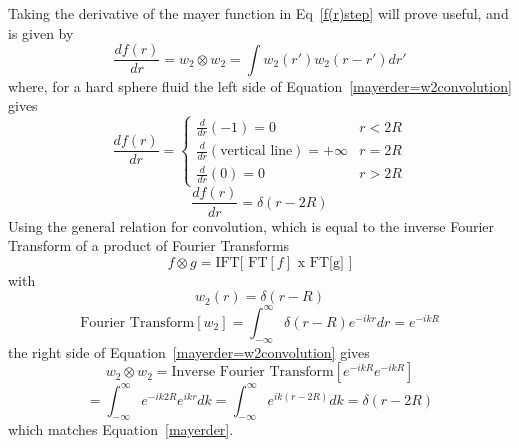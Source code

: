 \documentclass[double,12pt]{beavtex}
\begin{document}
Taking the derivative of the mayer function in Eq~\ref{f(r)step} will 
prove useful, and is given by
\begin{equation}\label{mayerder=w2convolution}{\frac{df(r)}{dr} = w_2 \otimes w_2 = \int{w_2(r')w_2(r-r')dr'}}\end{equation} 
where, for a hard sphere fluid the left side of Equation~\ref{mayerder=w2convolution} gives
\begin{displaymath}{\frac{df(r)}{dr}=\left\{ \begin{array}{rc} \frac{d}{dr}(-1)=0 & r<2R \\\frac{d}{dr}(\text{vertical line})=+\infty & r=2R \\ \frac{d}{dr}(0)=0  & r>2R \end{array}\right.}\end{displaymath}
\begin{equation}\label{mayerder}{\frac{df(r)}{dr} = \delta(r-2R)}\end{equation} 
Using the general relation for convolution, which is equal to the inverse 
Fourier Transform of a product of Fourier Transforms 
\begin{equation}{f \otimes g = \text{IFT[ FT}[f]\text{ x FT[g] }]}\end{equation} 
with
\begin{equation}{w_2(r)=\delta(r-R)}\end{equation} 
\begin{equation}{\text{Fourier Transform}[w_2]=\int_{-\infty}^{\infty}\delta(r-R)e^{-ikr}dr=e^{-ikR}}\end{equation} 
the right side of Equation~\ref{mayerder=w2convolution} gives
\begin{equation}{w_2 \otimes w_2 = \text{Inverse Fourier Transform}[e^{-ikR}e^{-ikR}]}\end{equation} 
\begin{equation}\label{w2convolution}{=\int_{-\infty}^{\infty}e^{-ik2R}e^{ikr}dk=\int_{-\infty}^{\infty}e^{ik(r-2R)}dk=\delta(r-2R)}\end{equation} 
which matches Equation~\ref{mayerder}.
\end{document}
